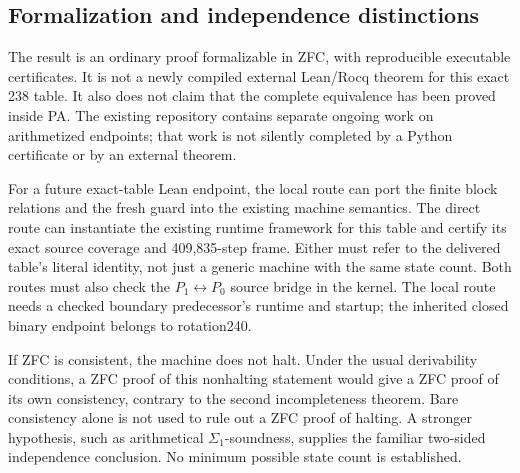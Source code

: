 \subsection{Formalization and independence distinctions}

The result is an ordinary proof formalizable in ZFC, with reproducible
executable certificates. It is not a newly compiled external Lean/Rocq
theorem for this exact 238 table. It also does not claim that the complete
equivalence has been proved inside PA. The existing repository contains
separate ongoing work on arithmetized endpoints; that work is not
silently completed by a Python certificate or by an external theorem.

For a future exact-table Lean endpoint, the local route can port the
finite block relations and the fresh guard into the existing machine
semantics. The direct route can instantiate the existing runtime
framework for this table and certify its exact source coverage and
409,835-step frame. Either must refer to the delivered table's literal
identity, not just a generic machine with the same state count.
Both routes must also check the $P_1\leftrightarrow P_0$ source bridge
in the kernel. The local route needs a checked boundary predecessor's
runtime and startup; the inherited closed binary endpoint belongs to
rotation240.

If ZFC is consistent, the machine does not halt. Under the usual
derivability conditions, a ZFC proof of this nonhalting statement would
give a ZFC proof of its own consistency, contrary to the second
incompleteness theorem. Bare consistency alone is not used to rule out
a ZFC proof of halting. A stronger hypothesis, such as arithmetical
$\Sigma_1$-soundness, supplies the familiar two-sided independence
conclusion. No minimum possible state count is established.
